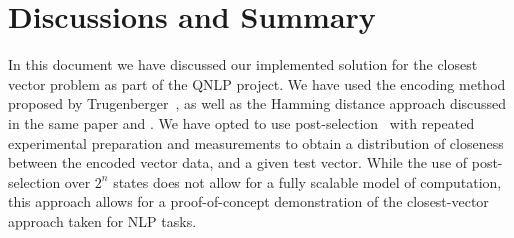 \section{Discussions and Summary}
\label{sec:discussion_and_summary}

In this document we have discussed our implemented solution for the closest vector problem as part of the QNLP project. We have used the encoding method proposed by Trugenberger~\cite{Trugenberger_2001}, as well as the Hamming distance approach discussed in the same paper and \cite{Schuld_Sinayskiy_Petruccione_2014}. We have opted to use post-selection~\cite{Aaronson_2005} with repeated experimental preparation and measurements to obtain a distribution of closeness between the encoded vector data, and a given test vector. While the use of post-selection over $2^n$ states does not allow for a fully scalable model of computation, this approach allows for a proof-of-concept demonstration of the closest-vector approach taken for NLP tasks. 

